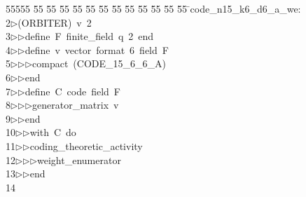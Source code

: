 %
%
\begin{tabbing}
55555 \= 55 \= 55 \= 55 \= 55 \= 55 \= 55 \= 55 \= 55 \= 55 \= 55 \= 55 \= 55 \= \>code\_n15\_k6\_d6\_a\_we:\\[0pt]
2\>$\triangleright$\>(ORBITER)\ v\ 2\ \\[0pt]
3\>$\triangleright$\>$\triangleright$\>define\ F\ finite\_field\ q\ 2\ end\ \\[0pt]
4\>$\triangleright$\>$\triangleright$\>define\ v\ vector\ format\ 6\ field\ F\ \\[0pt]
5\>$\triangleright$\>$\triangleright$\>$\triangleright$\>compact\ (CODE\_15\_6\_6\_A)\ \\[0pt]
6\>$\triangleright$\>$\triangleright$\>end\ \\[0pt]
7\>$\triangleright$\>$\triangleright$\>define\ C\ code\ field\ F\ \\[0pt]
8\>$\triangleright$\>$\triangleright$\>$\triangleright$\>generator\_matrix\ v\ \\[0pt]
9\>$\triangleright$\>$\triangleright$\>end\ \\[0pt]
10\>$\triangleright$\>$\triangleright$\>with\ C\ do\ \\[0pt]
11\>$\triangleright$\>$\triangleright$\>coding\_theoretic\_activity\ \\[0pt]
12\>$\triangleright$\>$\triangleright$\>$\triangleright$\>weight\_enumerator\ \\[0pt]
13\>$\triangleright$\>$\triangleright$\>end\\[0pt]
14\>\end{tabbing}

